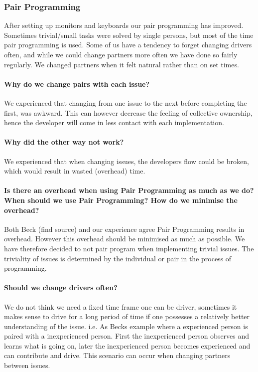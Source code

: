 \subsubsection{Pair Programming}
After setting up monitors and keyboards our pair programming has improved. Sometimes trivial/small tasks were solved by single persons, but most of the time pair programming is used.
Some of us have a tendency to forget changing drivers often, and while we could change partners more often we have done so fairly regularly. We changed partners when it felt natural rather than on set times.

\paragraph{Why do we change pairs with each issue?}
We experienced that changing from one issue to the next before completing the first, was awkward.
This can however decrease the feeling of collective ownership, hence the developer will come in less contact with each implementation.

\paragraph{Why did the other way not work?}
We experienced that when changing issues, the developers flow could be broken, which would result in wasted (overhead) time.

\paragraph{Is there an overhead when using Pair Programming as much as we do? When should we use Pair Programming? How do we minimise the overhead?}
Both Beck (find source) and our experience agree Pair Programming results in overhead.
However this overhead should be minimised as much as possible. We have therefore decided to not pair program when implementing trivial issues. The triviality of issues is determined by the individual or pair in the process of programming.

\paragraph{Should we change drivers often?}
We do not think we need a fixed time frame one can be driver, sometimes it makes sense to drive for a long period of time if one possesses a relatively better understanding of the issue. 
i.e. As Becks example where a experienced person is paired with a inexperienced person. First the inexperienced person observes and learns what is going on, later the inexperienced person becomes experienced and can contribute and drive. This scenario can occur when changing partners between issues. 

